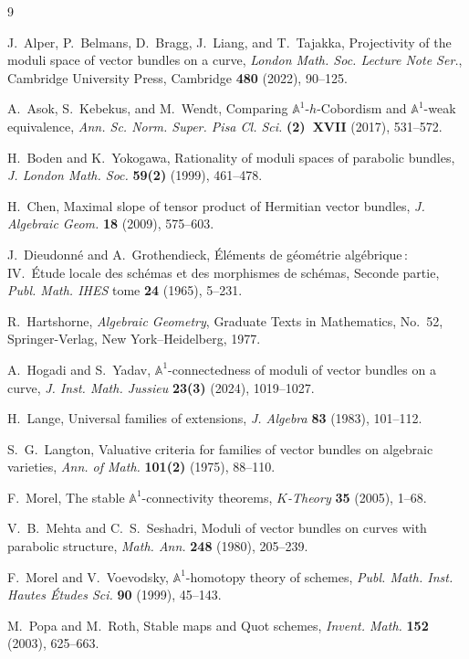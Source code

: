 \documentclass[12pt,reqno]{amsart}
\newcommand{\bb}[1]{\mathbb{#1}}
\theoremstyle{definition}
\numberwithin{equation}{section}
\begin{document}
	
	\begin{thebibliography}{9}
		
		J.~Alper, P.~Belmans, D.~Bragg, J.~Liang, and T.~Tajakka,
		Projectivity of the moduli space of vector bundles on a curve,
		\textit{London Math. Soc. Lecture Note Ser.},
		Cambridge University Press, Cambridge \textbf{480} (2022), 90--125.
		
		A.~Asok, S.~Kebekus, and M.~Wendt,
		Comparing $\bb{A}^1$-$h$-Cobordism and $\bb{A}^1$-weak equivalence,
		\textit{Ann. Sc. Norm. Super. Pisa Cl. Sci.} \textbf{(2)~XVII} (2017),
		531--572.
		
		H.~Boden and K.~Yokogawa,
		Rationality of moduli spaces of parabolic bundles,
		\textit{J. London Math. Soc.} \textbf{59(2)} (1999), 461--478.
		
		H.~Chen,
		Maximal slope of tensor product of Hermitian vector bundles,
		\textit{J. Algebraic Geom.} \textbf{18} (2009), 575--603.
		
		J.~Dieudonn\'e and A.~Grothendieck,
		\'El\'ements de g\'eom\'etrie alg\'ebrique\,: IV.~\'Etude locale des
		sch\'emas et des morphismes de sch\'emas, Seconde partie,
		\textit{Publ. Math. IHES} tome \textbf{24} (1965), 5--231.
		
		R.~Hartshorne,
		\textit{Algebraic Geometry},
		Graduate Texts in Mathematics, No.~52,
		Springer-Verlag, New York--Heidelberg, 1977.
		
		A.~Hogadi and S.~Yadav,
		${\mathbb A}^1$-connectedness of moduli of vector bundles on a curve,
		\textit{J. Inst. Math. Jussieu} \textbf{23(3)} (2024), 1019--1027.
		
		H.~Lange,
		Universal families of extensions,
		\textit{J. Algebra} \textbf{83} (1983), 101--112.
		
		S.~G.~Langton,
		Valuative criteria for families of vector bundles on algebraic varieties,
		\textit{Ann. of Math.} \textbf{101(2)} (1975), 88--110.
		
		F.~Morel,
		The stable $\mathbb{A}^1$-connectivity theorems,
		\textit{$K$-Theory} \textbf{35} (2005), 1--68.
		
		V.~B.~Mehta and C.~S.~Seshadri,
		Moduli of vector bundles on curves with parabolic structure,
		\textit{Math. Ann.} \textbf{248} (1980), 205--239.
		
		F.~Morel and V.~Voevodsky,
		$\bb{A}^1$-homotopy theory of schemes,
		\textit{Publ. Math. Inst. Hautes \'Etudes Sci.} \textbf{90} (1999), 45--143.
		
		M.~Popa and M.~Roth,
		Stable maps and Quot schemes,
		\textit{Invent. Math.} \textbf{152} (2003), 625--663.
		
		
	\end{thebibliography}
	
\end{document}
